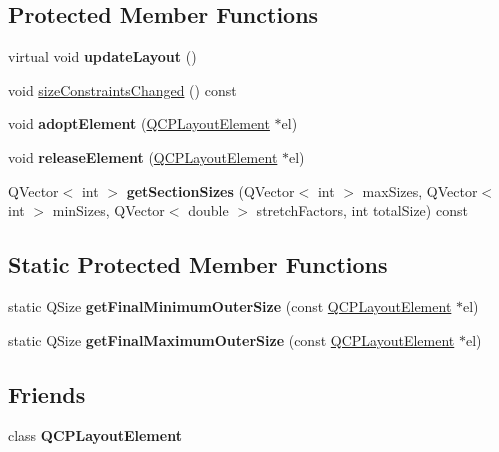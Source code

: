 \subsection*{Protected Member Functions}
\begin{DoxyCompactItemize}
\item 
\mbox{\label{classQCPLayout_a165c77f6287ac92e8d03017ad913378b}} 
virtual void {\bfseries update\+Layout} ()
\item 
void \hyperlink{classQCPLayout_aeac66a292f65cf7f8adf94eb92345b3e}{size\+Constraints\+Changed} () const
\item 
\mbox{\label{classQCPLayout_af6dbbc24156a808da29cd1ec031729a3}} 
void {\bfseries adopt\+Element} (\hyperlink{classQCPLayoutElement}{Q\+C\+P\+Layout\+Element} $\ast$el)
\item 
\mbox{\label{classQCPLayout_a4afbb4bef0071f72f91afdac4433a18e}} 
void {\bfseries release\+Element} (\hyperlink{classQCPLayoutElement}{Q\+C\+P\+Layout\+Element} $\ast$el)
\item 
\mbox{\label{classQCPLayout_a3e77be8006d39f2aafc1313d6e8fc3fd}} 
Q\+Vector$<$ int $>$ {\bfseries get\+Section\+Sizes} (Q\+Vector$<$ int $>$ max\+Sizes, Q\+Vector$<$ int $>$ min\+Sizes, Q\+Vector$<$ double $>$ stretch\+Factors, int total\+Size) const
\end{DoxyCompactItemize}
\subsection*{Static Protected Member Functions}
\begin{DoxyCompactItemize}
\item 
\mbox{\label{classQCPLayout_a864fddc84721f186663faf3683f1fa70}} 
static Q\+Size {\bfseries get\+Final\+Minimum\+Outer\+Size} (const \hyperlink{classQCPLayoutElement}{Q\+C\+P\+Layout\+Element} $\ast$el)
\item 
\mbox{\label{classQCPLayout_add49fd6843821a6126914b837ed52e22}} 
static Q\+Size {\bfseries get\+Final\+Maximum\+Outer\+Size} (const \hyperlink{classQCPLayoutElement}{Q\+C\+P\+Layout\+Element} $\ast$el)
\end{DoxyCompactItemize}
\subsection*{Friends}
\begin{DoxyCompactItemize}
\item 
\mbox{\label{classQCPLayout_a0790750c7e7f14fdbd960d172655b42b}} 
class {\bfseries Q\+C\+P\+Layout\+Element}
\end{DoxyCompactItemize}

